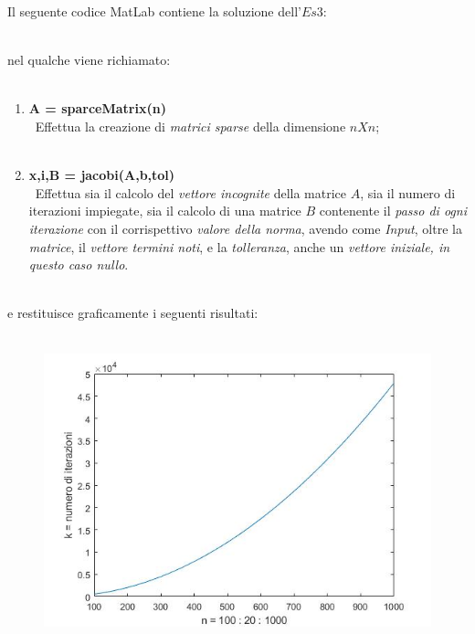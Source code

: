 Il seguente codice MatLab contiene la soluzione dell'$Es 3$:\\\
	
nel qualche viene richiamato:\\\
	\begin{enumerate}
		\item \textbf{A = sparceMatrix(n)}\\\
			Effettua la creazione di \textit{matrici sparse} della dimensione $nXn$;\\\
		\item \textbf{x,i,B = jacobi(A,b,tol)}\\\
			Effettua sia il calcolo del \textit{vettore incognite} della matrice $A$, sia il numero di iterazioni impiegate, sia il calcolo di una matrice $B$ contenente il \textit{passo di ogni iterazione} con il corrispettivo \textit{valore della norma}, avendo come \textit{Input}, oltre la 	\textit{matrice}, il \textit{vettore termini noti}, e la \textit{tolleranza}, anche un \textit{vettore iniziale, in questo caso nullo}.\\\
			
	\end{enumerate}
e restituisce graficamente i seguenti risultati:\\\
	\begin{figure}[H]
		\includegraphics[width=\textwidth]{Plot/Cap_6_Es_3}
	\end{figure}